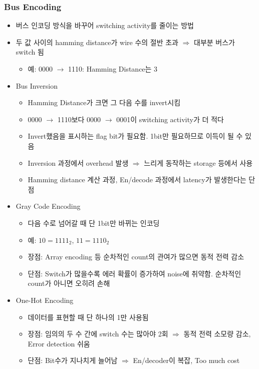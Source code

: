 \subsubsection*{Bus Encoding}
\begin{itemize}
    \item 버스 인코딩 방식을 바꾸어 switching activity를 줄이는 방법
    \item 두 값 사이의 hamming distance가 wire 수의 절반 초과 $\Rightarrow$ 대부분 버스가 switch 됨
    \begin{itemize}
        \item 예: 0000 $\rightarrow$ 1110: Hamming Distance는 3
    \end{itemize}
    \item Bus Inversion
    \begin{itemize}
        \item Hamming Distance가 크면 그 다음 수를 invert시킴
        \item 0000 $\rightarrow$ 1110보다 0000 $\rightarrow$ 0001이 switching activity가 더 적다
        \item Invert했음을 표시하는 flag bit가 필요함. 1bit만 필요하므로 이득이 될 수 있음
        \item Inversion 과정에서 overhead 발생 $\Rightarrow$ 느리게 동작하는 storage 등에서 사용
        \item Hamming distance 계산 과정, En/decode 과정에서 latency가 발생한다는 단점
    \end{itemize}
    \item Gray Code Encoding
    \begin{itemize}
        \item 다음 수로 넘어갈 때 단 1bit만 바뀌는 인코딩
        \item 예: $10 = 1111_2$, $11 = 1110_2$
        \item 장점: Array encoding 등 순차적인 count의 관여가 많으면 동적 전력 감소
        \item 단점: Switch가 많을수록 에러 확률이 증가하여 noise에 취약함. 순차적인 count가 아니면 오히려 손해
    \end{itemize}
    \item One-Hot Encoding
    \begin{itemize}
        \item 데이터를 표현할 때 단 하나의 1만 사용됨
        \item 장점: 임의의 두 수 간에 switch 수는 많아야 2회 $\Rightarrow$ 동적 전력 소모량 감소, Error detection 쉬움
        \item 단점: Bit수가 지나치게 늘어남 $\Rightarrow$ En/decoder이 복잡, Too much cost
    \end{itemize}
\end{itemize}

